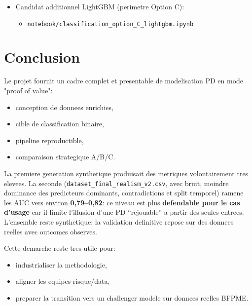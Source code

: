 \documentclass[11pt,a4paper]{article}
\begin{document}
\begin{itemize}[leftmargin=1.2cm]
  \item Candidat additionnel LightGBM (perimetre Option C):
  \begin{itemize}
    \item \texttt{notebook/classification\_option\_C\_lightgbm.ipynb}
  \end{itemize}
\end{itemize}

\section{Conclusion}

Le projet fournit un cadre complet et presentable de modelisation PD en mode "proof of value":
\begin{itemize}[leftmargin=1.2cm]
  \item conception de donnees enrichies,
  \item cible de classification binaire,
  \item pipeline reproductible,
  \item comparaison strategique A/B/C.
\end{itemize}

La premiere generation synthetique produisait des metriques volontairement tres elevees. La seconde (\texttt{dataset\_final\_realism\_v2.csv}, avec bruit, moindre dominance des predicteurs dominants, contradictions et split temporel) ramene les AUC vers environ \textbf{0,79--0,82}: ce niveau est plus \textbf{defendable pour le cas d'usage} car il limite l'illusion d'une PD ``rejouable'' a partir des seules entrees. L'ensemble reste synthetique: la validation definitive repose sur des donnees reelles avec outcomes observes.

Cette demarche reste tres utile pour:
\begin{itemize}[leftmargin=1.2cm]
  \item industrialiser la methodologie,
  \item aligner les equipes risque/data,
  \item preparer la transition vers un challenger modele sur donnees reelles BFPME.
\end{itemize}
\end{document}
